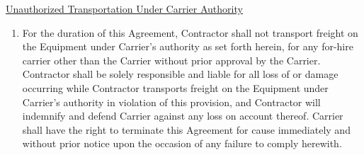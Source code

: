 \underline{Unauthorized Transportation Under Carrier Authority}
\begin{enumerate}[
    ref = \SecondLevelEnumerator
]
    \item For the duration of this Agreement, Contractor shall not
    transport freight on the Equipment under Carrier's authority as set
    forth herein, for any for-hire carrier other than the Carrier without
    prior approval by the Carrier. Contractor shall be solely responsible
    and liable for all loss of or damage occurring while Contractor
    transports freight on the Equipment under Carrier's authority in
    violation of this provision, and Contractor will indemnify and defend
    Carrier against any loss on account thereof. Carrier shall have the
    right to terminate this Agreement for cause immediately and without
    prior notice upon the occasion of any failure to comply herewith.
\end{enumerate}